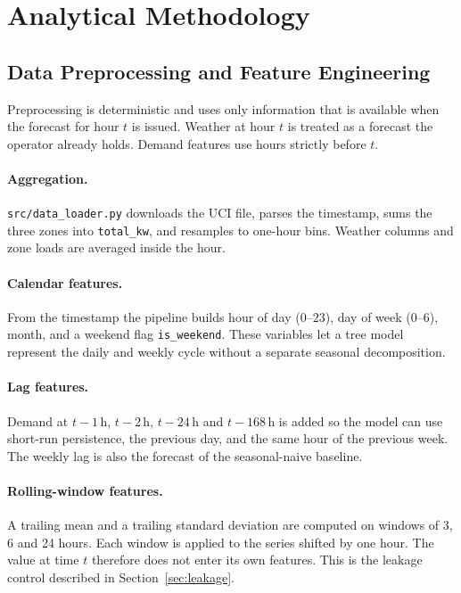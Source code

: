 \section{Analytical Methodology}
\label{sec:methodology}

\subsection{Data Preprocessing and Feature Engineering}
\label{sec:features}

Preprocessing is deterministic and uses only information that is available
when the forecast for hour \(t\) is issued. Weather at hour \(t\) is treated
as a forecast the operator already holds. Demand features use hours strictly
before \(t\).

\paragraph{Aggregation.}
\texttt{src/data\_loader.py} downloads the UCI file, parses the timestamp, sums
the three zones into \texttt{total\_kw}, and resamples to one-hour bins.
Weather columns and zone loads are averaged inside the hour.

\paragraph{Calendar features.}
From the timestamp the pipeline builds hour of day (\(0\)--\(23\)), day of
week (\(0\)--\(6\)), month, and a weekend flag \texttt{is\_weekend}. These
variables let a tree model represent the daily and weekly cycle without a
separate seasonal decomposition.

\paragraph{Lag features.}
Demand at \(t-1\,\mathrm{h}\), \(t-2\,\mathrm{h}\), \(t-24\,\mathrm{h}\) and
\(t-168\,\mathrm{h}\) is added so the model can use short-run persistence, the
previous day, and the same hour of the previous week. The weekly lag is also
the forecast of the seasonal-naive baseline.

\paragraph{Rolling-window features.}
A trailing mean and a trailing standard deviation are computed on windows of
3, 6 and 24 hours. Each window is applied to the series shifted by one hour.
The value at time \(t\) therefore does not enter its own features. This is
the leakage control described in Section~\ref{sec:leakage}.

